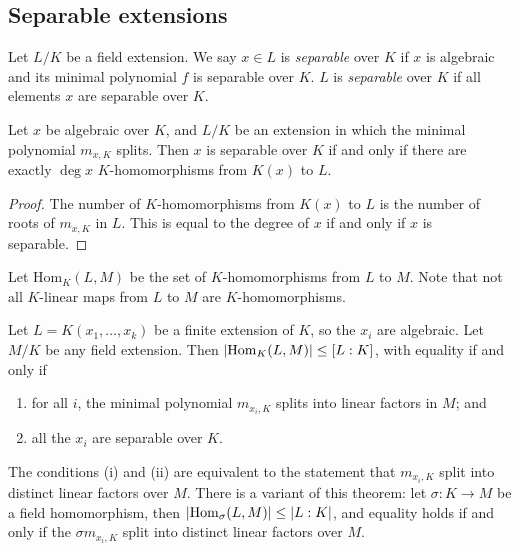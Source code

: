\subsection{Separable extensions}
\begin{definition}
	Let \( L / K \) be a field extension.
	We say \( x \in L \) is \emph{separable} over \( K \) if \( x \) is algebraic and its minimal polynomial \( f \) is separable over \( K \).
	\( L \) is \emph{separable} over \( K \) if all elements \( x \) are separable over \( K \).
\end{definition}
\begin{theorem}
	Let \( x \) be algebraic over \( K \), and \( L / K \) be an extension in which the minimal polynomial \( m_{x,K} \) splits.
	Then \( x \) is separable over \( K \) if and only if there are exactly \( \deg x \) \( K \)-homomorphisms from \( K(x) \) to \( L \).
\end{theorem}
\begin{proof}
	The number of \( K \)-homomorphisms from \( K(x) \) to \( L \) is the number of roots of \( m_{x,K} \) in \( L \).
	This is equal to the degree of \( x \) if and only if \( x \) is separable.
\end{proof}
Let \( \mathrm{Hom}_K(L,M) \) be the set of \( K \)-homomorphisms from \( L \) to \( M \).
Note that not all \( K \)-linear maps from \( L \) to \( M \) are \( K \)-homomorphisms.
\begin{theorem}
	Let \( L = K(x_1, \dots, x_k) \) be a finite extension of \( K \), so the \( x_i \) are algebraic.
	Let \( M / K \) be any field extension.
	Then \( \abs{\mathrm{Hom}_K(L,M)} \leq [L : K] \), with equality if and only if
	\begin{enumerate}
		\item for all \( i \), the minimal polynomial \( m_{x_i,K} \) splits into linear factors in \( M \); and
		\item all the \( x_i \) are separable over \( K \).
	\end{enumerate}
\end{theorem}
\begin{remark}
	The conditions (i) and (ii) are equivalent to the statement that \( m_{x_i,K} \) split into distinct linear factors over \( M \).
	There is a variant of this theorem: let \( \sigma : K \to M \) be a field homomorphism, then \( \abs{\mathrm{Hom}_\sigma(L,M)} \leq \abs{L:K} \), and equality holds if and only if the \( \sigma m_{x_i,K} \) split into distinct linear factors over \( M \).
\end{remark}
